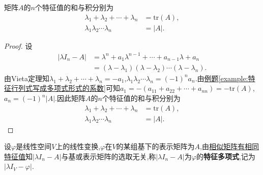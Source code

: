 \documentclass[lang=cn,newtx,10pt,scheme=chinese]{elegantbook}
\begin{document}
\begin{theorem}[特征值的和与积]\label{theorem:特征值的和与积}
矩阵$A$的$n$个特征值的和与积分别为
\begin{align*}
\lambda_1 + \lambda_2 + \cdots + \lambda_n &= \mathrm{tr}(A), \\
\lambda_1 \lambda_2 \cdots \lambda_n &= |A|.
\end{align*}
\end{theorem}
\begin{proof}
设
\begin{align*}
|\lambda I_n - A| &= \lambda^n + a_1 \lambda^{n-1} + \cdots + a_{n-1} \lambda + a_n \\
&= (\lambda - \lambda_1)(\lambda - \lambda_2) \cdots (\lambda - \lambda_n).
\end{align*}
由Vieta定理知$\lambda_1 + \lambda_2 + \cdots + \lambda_n = -a_1$,$\lambda_1 \lambda_2 \cdots \lambda_n = (-1)^n a_n$.由\hyperref[example:特征行列式写成多项式形式的系数]{例题\ref{example:特征行列式写成多项式形式的系数}}可知$a_1 = -(a_{11} + a_{22} + \cdots + a_{nn}) = -\mathrm{tr}(A)$,$a_n = (-1)^n |A|$.因此矩阵$A$的$n$个特征值的和与积分别为
\begin{align*}
\lambda_1 + \lambda_2 + \cdots + \lambda_n &= \mathrm{tr}(A), \\
\lambda_1 \lambda_2 \cdots \lambda_n &= |A|.
\end{align*}
\end{proof}

\begin{definition}[特征多项式]
设$\varphi$是线性空间$V$上的线性变换,$\varphi$在$V$的某组基下的表示矩阵为$A$,由\hyperref[theorem:相似矩阵有相同特征值]{相似矩阵有相同特征值}知$|\lambda I_n - A|$与基或表示矩阵的选取无关,称$|\lambda I_n - A|$为$\varphi$的\textbf{特征多项式},记为$|\lambda I_V - \varphi|$.
\end{definition}
\end{document}
